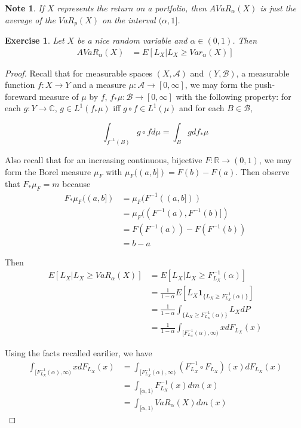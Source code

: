 \documentclass[12pt]{amsart}
\newtheorem{note}[thm]{Note}
\newtheorem{ex}[thm]{Exercise}
\newcommand{\al}{\alpha}
\newcommand{\C}{\mathbb{C}}
\newcommand{\R}{\mathbb{R}}
\newcommand{\MA}{\mathcal{A}}
\newcommand{\MB}{\mathcal{B}}
\newcommand{\RG}{[0,\infty]}
\begin{document}
\begin{note}
If $X$ represents the return on a portfolio, then $AVaR_{\al}(X)$ is just the average of the $VaR_{p}(X)$ on the interval $(\al, 1]$.
\end{note}

\begin{ex}
Let $X$ be a nice random variable and $\al\in (0,1)$. Then 
\begin{align*}
AVaR_{\al}(X) 
&= E[L_X|L_X \geq Var_{\al}(X)]
\end{align*}
\end{ex}

\begin{proof}
Recall that for measurable spaces $(X,\MA)$ and $(Y, \MB)$, a measurable function $f:X \rightarrow Y$ and a measure $\mu:\MA \rightarrow \RG$, we may form the push-foreward measure of $\mu$ by $f$, $f_{*}\mu:\MB \rightarrow \RG$ with the following property: for each $g:Y \rightarrow \C$, $g \in L^1(f_* \mu)$ iff  $g \circ f \in L^1(\mu)$ and for each $B \in \MB$, 

$$\int_{f^{-1}(B)}g \circ f d\mu = \int_B g d f_*\mu$$

Also recall that for an increasing continuous, bijective $F:\R \rightarrow (0,1)$, we may form the Borel measure $\mu_F$ with $\mu_F((a,b]) = F(b)-F(a)$. Then observe that $F_*\mu_F = m$ because
\begin{align*}
{F}_{*} \mu_F ((a,b]) 
&= \mu_F(F^{-1}((a,b]))\\
&= \mu_F((F^{-1}(a), F^{-1}(b)]) \\ 
&= F(F^{-1}(a)) - F(F^{-1}(b))\\
&= b-a
\end{align*}

Then  
\begin{align*}
E[L_X |L_X \geq VaR_{\al}(X)]
&= E[L_X|L_X \geq F^{-1}_{L_X}(\al)] \\ 
&= \frac{1}{1-\al}E [L_X \mathbf{1}_{\{L_X \geq F^{-1}_{L_X}(\al)\}}] \\ 
&=  \frac{1}{1-\al} \int_{\{L_X \geq F_{L_X}^{-1}(\al)\}}L_X dP \\
& = \frac{1}{1-\al} \int_{[F_{L_X}^{-1}(\al),  \infty)}xd F_{L_X}(x)
\end{align*}

Using the facts recalled earilier, we have  
\begin{align*}
\int_{[F_{L_X}^{-1}(\al),  \infty)}xd F_{L_X}(x) 
&= \int_{[F_{L_X}^{-1}(\al),  \infty)}(F^{-1}_{L_X} \circ F_{L_X}) (x)d F_{L_X}(x) \\
&= \int_{[\al,  1)} F^{-1}_{L_X}(x)dm(x)\\
&= \int_{[\al,  1)} VaR_{\al}(X)dm(x)
\end{align*}
\end{proof}
\end{document}
